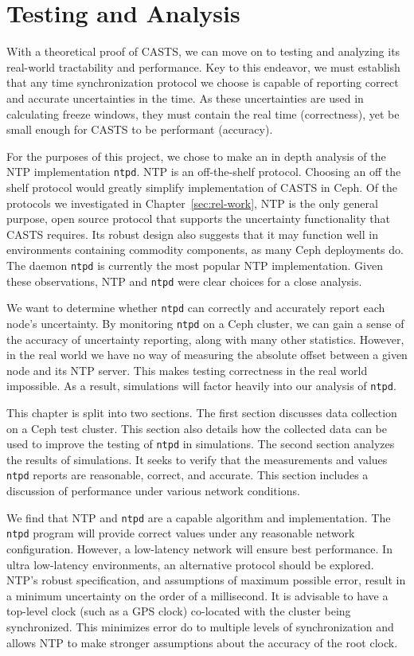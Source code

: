 \chapter{Testing and Analysis}
\label{sec:results}

With a theoretical proof of CASTS, we can move on to testing
and analyzing its real-world tractability and performance.  Key to
this endeavor, we must establish that any time synchronization
protocol we choose is capable of reporting correct and accurate
uncertainties in the time. As these uncertainties are used in
calculating freeze windows, they must contain the real time
(correctness), yet be small enough for CASTS to be performant
(accuracy).

For the purposes of this project, we chose to make an in depth
analysis of the NTP implementation \texttt{ntpd}. NTP is an
off-the-shelf protocol. Choosing an off the shelf protocol would
greatly simplify implementation of CASTS in Ceph. Of the
protocols we investigated in Chapter~\ref{sec:rel-work}, NTP is the
only general purpose, open source protocol that supports the
uncertainty functionality that CASTS requires. Its robust
design also suggests that it may function well in environments
containing commodity components, as many Ceph deployments do. The
daemon \texttt{ntpd} is currently the most popular NTP
implementation. Given these observations, NTP and \texttt{ntpd} were
clear choices for a close analysis.

We want to determine whether \texttt{ntpd} can correctly and
accurately report each node's uncertainty. By monitoring \texttt{ntpd}
on a Ceph cluster, we can gain a sense of the accuracy of uncertainty
reporting, along with many other statistics. However, in the real
world we have no way of measuring the absolute offset between a given
node and its NTP server. This makes testing correctness in the real
world impossible. As a result, simulations will factor heavily into
our analysis of \texttt{ntpd}.

This chapter is split into two sections. The first section discusses
data collection on a Ceph test cluster. This section also details how
the collected data can be used to improve the testing of \texttt{ntpd}
in simulations.  The second section analyzes the results of
simulations. It seeks to verify that the measurements and values
\texttt{ntpd} reports are reasonable, correct, and accurate. This
section includes a discussion of performance under various network
conditions.

We find that NTP and \texttt{ntpd} are a capable algorithm and
implementation.  The \texttt{ntpd} program will provide correct values
under any reasonable network configuration. However, a low-latency
network will ensure best performance. In ultra low-latency
environments, an alternative protocol should be explored. NTP's robust
specification, and assumptions of maximum possible error, result in a
minimum uncertainty on the order of a millisecond.  It is advisable to
have a top-level clock (such as a GPS clock) co-located with the
cluster being synchronized. This minimizes error do to multiple levels
of synchronization and allows NTP to make stronger assumptions about
the accuracy of the root clock.



